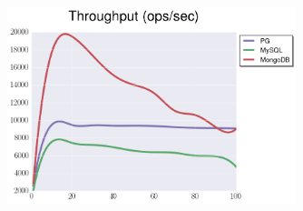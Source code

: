 \documentclass[usenames,dvipsnames, 18pt, compress, aspectratio=169]{beamer}
\begin{document}
\begin{frame}
    \frametitle{}
    \begin{center}
    \begin{figure}
        \includegraphics[width=0.75\textwidth,center]{benchmarks/select_slice_10_btree_throughput.png}
    \end{figure}
    \end{center}
\end{frame}

\fontsize{17pt}{19}\selectfont
{}

%
\begin{frame}
    \frametitle{}
\end{frame}
\end{document}
